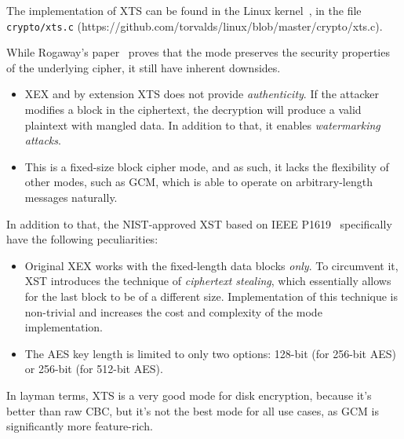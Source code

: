 The implementation of XTS can be found in the Linux kernel~\cite{linux-kernel}, in the file \texttt{crypto/xts.c} (https://github.com/torvalds/linux/blob/master/crypto/xts.c).

While Rogaway's paper~\cite{Rogaway} proves that the mode preserves the security properties of the underlying cipher, it still have inherent downsides.

\begin{itemize}
    \item XEX and by extension XTS does not provide \textit{authenticity}. If the attacker modifies a block in the ciphertext, the decryption will produce a valid plaintext with mangled data. In addition to that, it enables \textit{watermarking attacks}.
    \item This is a fixed-size block cipher mode, and as such, it lacks the flexibility of other modes, such as GCM, which is able to operate on arbitrary-length messages naturally.
\end{itemize}

In addition to that, the NIST-approved XST based on IEEE P1619~\cite{IEEE1619} specifically have the following peculiarities:
\begin{itemize}
    \item Original XEX works with the fixed-length data blocks \textit{only}.
    To circumvent it, XST introduces the technique of \textit{ciphertext stealing}, which essentially allows for the last block to be of a different size.
    Implementation of this technique is non-trivial and increases the cost and complexity of the mode implementation.
    \item The AES key length is limited to only two options: 128-bit (for 256-bit AES) or 256-bit (for 512-bit AES).
\end{itemize}

In layman terms, XTS is a very good mode for disk encryption, because it's better than raw CBC, but it's not the best mode for all use cases, as GCM is significantly more feature-rich.
